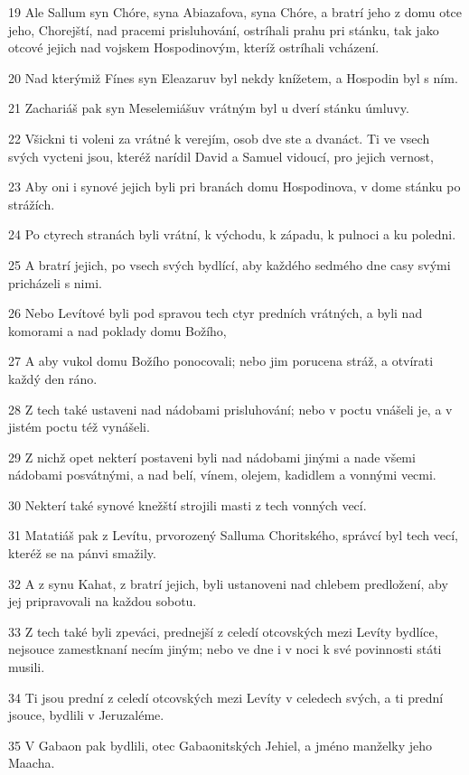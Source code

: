 \par 19 Ale Sallum syn Chóre, syna Abiazafova, syna Chóre, a bratrí jeho z domu otce jeho, Chorejští, nad pracemi prisluhování, ostríhali prahu pri stánku, tak jako otcové jejich nad vojskem Hospodinovým, kteríž ostríhali vcházení.
\par 20 Nad kterýmiž Fínes syn Eleazaruv byl nekdy knížetem, a Hospodin byl s ním.
\par 21 Zachariáš pak syn Meselemiášuv vrátným byl u dverí stánku úmluvy.
\par 22 Všickni ti voleni za vrátné k verejím, osob dve ste a dvanáct. Ti ve vsech svých vycteni jsou, kteréž narídil David a Samuel vidoucí, pro jejich vernost,
\par 23 Aby oni i synové jejich byli pri branách domu Hospodinova, v dome stánku po strážích.
\par 24 Po ctyrech stranách byli vrátní, k východu, k západu, k pulnoci a ku poledni.
\par 25 A bratrí jejich, po vsech svých bydlící, aby každého sedmého dne casy svými pricházeli s nimi.
\par 26 Nebo Levítové byli pod spravou tech ctyr predních vrátných, a byli nad komorami a nad poklady domu Božího,
\par 27 A aby vukol domu Božího ponocovali; nebo jim porucena stráž, a otvírati každý den ráno.
\par 28 Z tech také ustaveni nad nádobami prisluhování; nebo v poctu vnášeli je, a v jistém poctu též vynášeli.
\par 29 Z nichž opet nekterí postaveni byli nad nádobami jinými a nade všemi nádobami posvátnými, a nad belí, vínem, olejem, kadidlem a vonnými vecmi.
\par 30 Nekterí také synové knežští strojili masti z tech vonných vecí.
\par 31 Matatiáš pak z Levítu, prvorozený Salluma Choritského, správcí byl tech vecí, kteréž se na pánvi smažily.
\par 32 A z synu Kahat, z bratrí jejich, byli ustanoveni nad chlebem predložení, aby jej pripravovali na každou sobotu.
\par 33 Z tech také byli zpeváci, prednejší z celedí otcovských mezi Levíty bydlíce, nejsouce zamestknaní necím jiným; nebo ve dne i v noci k své povinnosti státi musili.
\par 34 Ti jsou prední z celedí otcovských mezi Levíty v celedech svých, a ti prední jsouce, bydlili v Jeruzaléme.
\par 35 V Gabaon pak bydlili, otec Gabaonitských Jehiel, a jméno manželky jeho Maacha.
